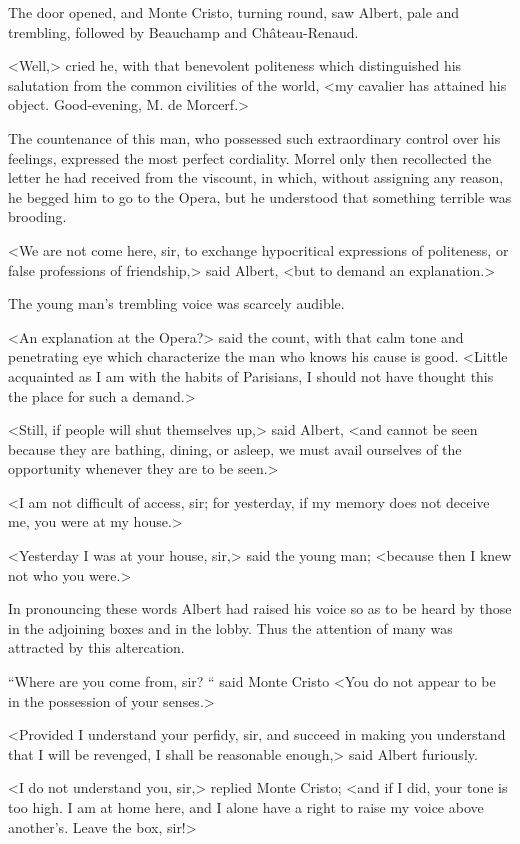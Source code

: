  The door opened, and Monte Cristo, turning round, saw Albert, pale and trembling, followed by Beauchamp and Château-Renaud. 

 <Well,> cried he, with that benevolent politeness which distinguished his salutation from the common civilities of the world, <my cavalier has attained his object. Good-evening, M. de Morcerf.> 

 The countenance of this man, who possessed such extraordinary control over his feelings, expressed the most perfect cordiality. Morrel only then recollected the letter he had received from the viscount, in which, without assigning any reason, he begged him to go to the Opera, but he understood that something terrible was brooding. 

 <We are not come here, sir, to exchange hypocritical expressions of politeness, or false professions of friendship,> said Albert, <but to demand an explanation.> 

 The young man's trembling voice was scarcely audible. 

 <An explanation at the Opera?> said the count, with that calm tone and penetrating eye which characterize the man who knows his cause is good. <Little acquainted as I am with the habits of Parisians, I should not have thought this the place for such a demand.> 

 <Still, if people will shut themselves up,> said Albert, <and cannot be seen because they are bathing, dining, or asleep, we must avail ourselves of the opportunity whenever they are to be seen.> 

 <I am not difficult of access, sir; for yesterday, if my memory does not deceive me, you were at my house.> 

 <Yesterday I was at your house, sir,> said the young man; <because then I knew not who you were.> 

 In pronouncing these words Albert had raised his voice so as to be heard by those in the adjoining boxes and in the lobby. Thus the attention of many was attracted by this altercation. 

 “Where are you come from, sir? “ said Monte Cristo <You do not appear to be in the possession of your senses.> 

 <Provided I understand your perfidy, sir, and succeed in making you understand that I will be revenged, I shall be reasonable enough,> said Albert furiously. 

 <I do not understand you, sir,> replied Monte Cristo; <and if I did, your tone is too high. I am at home here, and I alone have a right to raise my voice above another's. Leave the box, sir!> 

